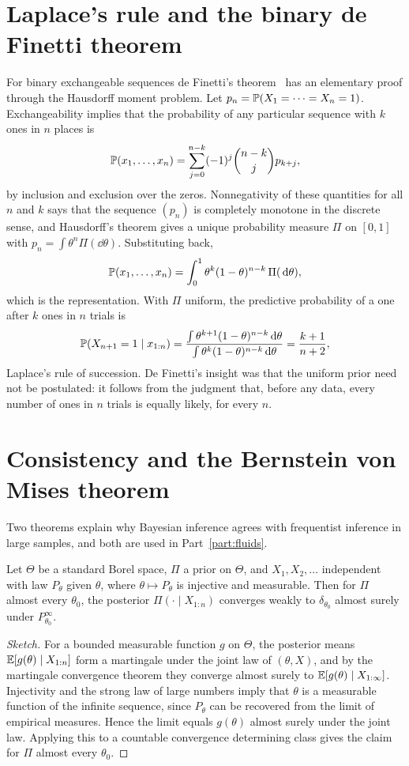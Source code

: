\section{Laplace's rule and the binary de Finetti theorem}
\label{sec:binary_definetti}

For binary exchangeable sequences de Finetti's theorem~\cite{definetti1937} has an elementary proof through the Hausdorff moment problem. Let $p_n = \P(X_1 = \cdots = X_n = 1)$. Exchangeability implies that the probability of any particular sequence with $k$ ones in $n$ places is
\[
\P(x_1,\dots,x_n) = \sum_{j=0}^{n-k}(-1)^j\binom{n-k}{j}p_{k+j},
\]
by inclusion and exclusion over the zeros. Nonnegativity of these quantities for all $n$ and $k$ says that the sequence $(p_n)$ is completely monotone in the discrete sense, and Hausdorff's theorem gives a unique probability measure $\Pi$ on $[0,1]$ with $p_n = \int\theta^n\Pi(\dd\theta)$. Substituting back,
\[
\P(x_1,\dots,x_n) = \int_0^1\theta^k(1-\theta)^{n-k}\,\Pi(\dd\theta),
\]
which is the representation. With $\Pi$ uniform, the predictive probability of a one after $k$ ones in $n$ trials is
\[
\P(X_{n+1} = 1\mid x_{1:n}) = \frac{\int\theta^{k+1}(1-\theta)^{n-k}\dd\theta}{\int\theta^k(1-\theta)^{n-k}\dd\theta} = \frac{k+1}{n+2},
\]
Laplace's rule of succession. De Finetti's insight was that the uniform prior need not be postulated: it follows from the judgment that, before any data, every number of ones in $n$ trials is equally likely, for every $n$.

\section{Consistency and the Bernstein von Mises theorem}

Two theorems explain why Bayesian inference agrees with frequentist inference in large samples, and both are used in Part~\ref{part:fluids}.

\begin{theorem}[Doob]
\label{thm:doob}
Let $\Theta$ be a standard Borel space, $\Pi$ a prior on $\Theta$, and $X_1,X_2,\dots$ independent with law $P_\theta$ given $\theta$, where $\theta\mapsto P_\theta$ is injective and measurable. Then for $\Pi$ almost every $\theta_0$, the posterior $\Pi(\cdot\mid X_{1:n})$ converges weakly to $\delta_{\theta_0}$ almost surely under $P_{\theta_0}^\infty$.
\end{theorem}

\begin{proof}[Sketch]
For a bounded measurable function $g$ on $\Theta$, the posterior means $\E[g(\theta)\mid X_{1:n}]$ form a martingale under the joint law of $(\theta,X)$, and by the martingale convergence theorem they converge almost surely to $\E[g(\theta)\mid X_{1:\infty}]$. Injectivity and the strong law of large numbers imply that $\theta$ is a measurable function of the infinite sequence, since $P_\theta$ can be recovered from the limit of empirical measures. Hence the limit equals $g(\theta)$ almost surely under the joint law. Applying this to a countable convergence determining class gives the claim for $\Pi$ almost every $\theta_0$.
\end{proof}

